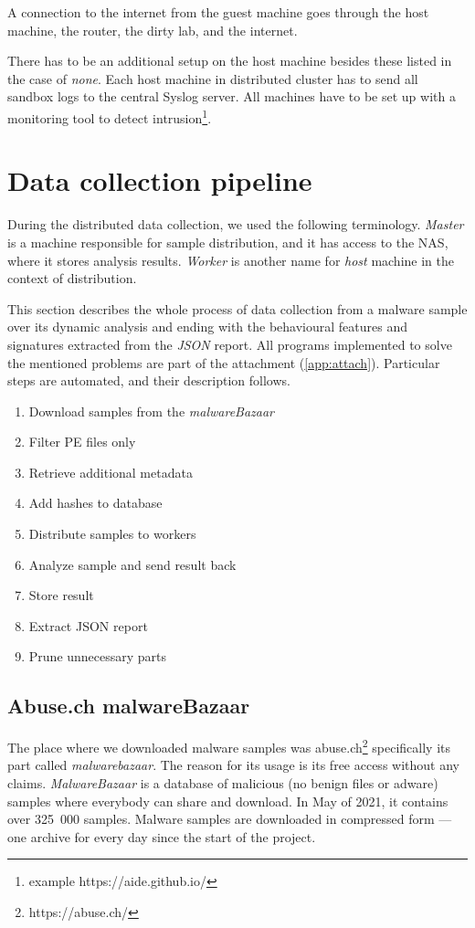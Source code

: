 A connection to the internet from the guest machine goes through the host machine, the router, the dirty lab, and the internet. 

There has to be an additional setup on the host machine besides these listed in the case of \emph{none}. Each host machine in distributed cluster has to send all sandbox logs to the central Syslog server. All machines have to be set up with a monitoring tool to detect intrusion\footnote{example https://aide.github.io/}.

\section{Data collection pipeline}
During the distributed data collection, we used the following terminology. \emph{Master} is a machine responsible for sample distribution, and it has access to the NAS, where it stores analysis results. \emph{Worker} is another name for \emph{host} machine in the context of distribution.

This section describes the whole process of data collection from a malware sample over its dynamic analysis and ending with the behavioural features and signatures extracted from the \emph{JSON} report. All programs implemented to solve the mentioned problems are part of the attachment (\ref{app:attach}). Particular steps are automated, and their description follows.

\begin{enumerate}
    \itemsep0em 
    \item Download samples from the \emph{malwareBazaar}
    \item Filter PE files only
    \item Retrieve additional metadata
    \item Add hashes to database
    \item Distribute samples to workers
    \item Analyze sample and send result back
    \item Store result
    \item Extract JSON report
    \item Prune unnecessary parts
\end{enumerate}


\subsection{Abuse.ch malwareBazaar}
The place where we downloaded malware samples was abuse.ch\footnote{https://abuse.ch/} specifically its part called \emph{malwarebazaar}. The reason for its usage is its free access without any claims. \emph{MalwareBazaar} is a database of malicious (no benign files or adware) samples where everybody can share and download. In May of 2021, it contains over 325~000 samples. Malware samples are downloaded in compressed form --- one archive for every day since the start of the project.

